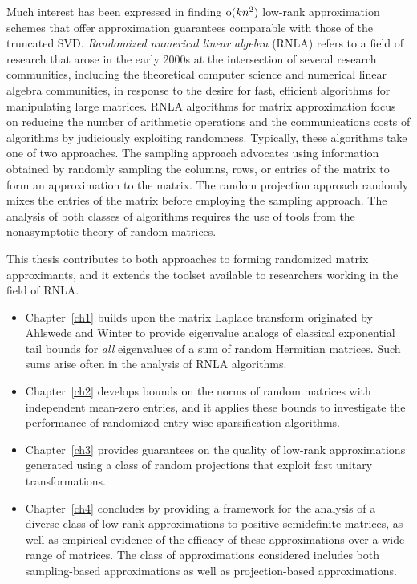 Much interest has been expressed in finding $\mathrm{o}(kn^2)$
low-rank approximation schemes that offer approximation guarantees comparable with those of
the truncated SVD.  \emph{Randomized numerical linear algebra} (RNLA) refers to a field of research
that arose in the early 2000s at the intersection
of several research communities, including the theoretical computer science and numerical
linear algebra communities, in response to the desire for fast, efficient algorithms for
manipulating large matrices. RNLA algorithms for matrix approximation focus on reducing the number of 
arithmetic operations and the communications costs of algorithms
by judiciously exploiting randomness.
Typically, these algorithms take one of two approaches. The sampling approach
advocates using information obtained by randomly sampling the columns, rows, or 
entries of the matrix to form an approximation to the matrix. 
The random projection approach randomly mixes the entries of the matrix before employing
the sampling approach. The analysis of both classes of algorithms requires the use of 
tools from the nonasymptotic theory of random
matrices.

This thesis contributes to both approaches to forming randomized matrix approximants, and it extends the toolset
available to researchers working in the field of RNLA. 
\begin{itemize}
 \item Chapter~\ref{ch1} builds upon the matrix
Laplace transform originated by Ahlswede and Winter to provide eigenvalue analogs of 
classical exponential tail bounds for \emph{all} eigenvalues of a sum of random Hermitian matrices.
Such sums arise often in the analysis of RNLA algorithms.
 \item Chapter~\ref{ch2} develops
bounds on the norms of random matrices with independent mean-zero entries, and it applies these bounds
to investigate the performance of randomized entry-wise sparsification algorithms.
 \item Chapter~\ref{ch3} provides guarantees on the quality of low-rank approximations generated using
a class of random projections that exploit fast unitary transformations.
 \item Chapter~\ref{ch4} concludes by providing a framework for the analysis of a diverse class of low-rank approximations
to positive-semidefinite matrices, as well as empirical evidence of the efficacy of these
approximations over a wide range of matrices. The class of approximations considered includes both
sampling-based approximations as well as projection-based approximations.
\end{itemize}
 
